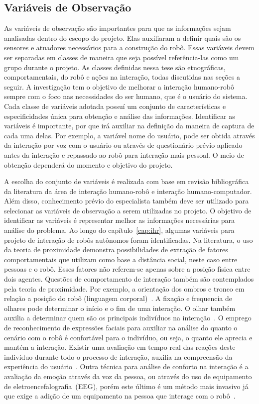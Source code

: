 \subsection{Variáveis de Observação}
\label{sec:variaveis}
As variáveis de observação são importantes para que as informações sejam analisadas dentro do escopo do projeto. Elas auxiliaram a definir quais são os sensores e atuadores necessários para a construção do robô. Essas variáveis devem ser separadas em classes de maneira que seja possível referência-las como um grupo durante o projeto. As classes definidas nessa tese são etnográficas, comportamentais, do robô e ações na interação, todas discutidas nas seções a seguir. A investigação tem o objetivo de melhorar a interação humano-robô sempre com o foco nas necessidades do ser humano, que é o usuário do sistema. Cada classe de variáveis adotada possuí um conjunto de características e especificidades única para obtenção e análise das informações. Identificar as variáveis é importante, por que irá auxiliar na definição da maneira de captura de cada uma delas. Por exemplo, a variável nome do usuário, pode ser obtida através da interação por voz com o usuário ou através de questionário prévio aplicado antes da interação e repassado ao robô para interação mais pessoal. O meio de obtenção dependerá do momento e objetivo do projeto.

A escolha do conjunto de variáveis é realizada com base em revisão bibliográfica da literatura da área de interação humano-robô e interação humano-computador. Além disso, conhecimento prévio do especialista também deve ser utilizado para selecionar as variáveis de observação a serem utilizadas no projeto. O objetivo de identificar as variáveis é representar melhor as informações necessárias para análise do problema. Ao longo do capítulo~\ref{cap:ihr}, algumas variáveis para projeto de interação de robôs autônomos foram identificadas. Na literatura, o uso da teoria de proximidade demonstra possibilidades de extração de fatores comportamentais que utilizam como base a distância social, neste caso entre pessoas e o robô. Esses fatores não referem-se apenas sobre a posição física entre dois agentes. Questões de comportamento de interação também são contemplados pela teoria de proximidade. Por exemplo, a orientação dos ombros e tronco em relação a posição do robô (linguagem corporal)~\cite{mead:2016}. A fixação e frequencia de olhares pode determinar o início e o fim de uma interação. O olhar também auxilia a determinar quem são os principais indivíduos na interação~\cite{mumm:2011, srinivasan:2012}. O emprego de reconhecimento de expressões faciais para auxiliar na análise do quanto o cenário com o robô é confortável para o indivíduo, ou seja, o quanto ele aprecia e mantém a interação. Existir uma avaliação em tempo real das reações deste indivíduo durante todo o processo de interação, auxilia na compreensão da experiência do usuário~\cite{amaral:2014}. Outra técnica para análise de conforto na interação é a avaliação da emoção através da voz da pessoa, ou através do uso de equipamento de eletroencefalografia~(EEG), porém este último é um método mais invasivo já que exige a adição de um equipamento na pessoa que interage com o robô~\cite{bos:2006, lee:2014}.

